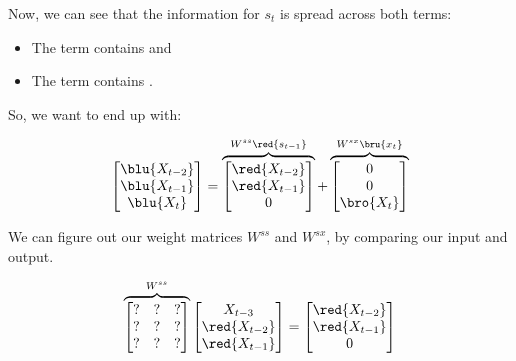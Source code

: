         Now, we can see that the information for $s_t$ is spread across both terms:

        \begin{itemize}
            \item The  term contains  and 
            \item The  term contains . 
        \end{itemize}

        So, we want to end up with:

        \begin{equation}
            \begin{bmatrix}
                \blu{X_{t-2}} \\ \blu{X_{t-1}} \\ \blu{X_{t}}
            \end{bmatrix} 
            =
            \overbrace{
                \begin{bmatrix}
                    \red{X_{t-2}} \\ \red{X_{t-1}} \\ 0
                \end{bmatrix}
            }^{W^{ss}\red{s_{t-1}} }
            +
            \overbrace{
                \begin{bmatrix}
                    0 \\ 0 \\ \bro{X_t}
                \end{bmatrix}
            }^{W^{sx}\bru{x_t}}
        \end{equation}

    \subsecdiv

        We can figure out our weight matrices $W^{ss}$ and $W^{sx}$, by comparing our input and output.


        \begin{equation}
            \overbrace{
                \begin{bmatrix}
                    ? & ? & ? \\
                    ? & ? & ? \\
                    ? & ? & ?
                \end{bmatrix}
            }^{W^{ss}}
            \begin{bmatrix}
                X_{t-3} \\ \red{X_{t-2}} \\ \red{X_{t-1}}
            \end{bmatrix} 
            = 
            \begin{bmatrix}
                \red{X_{t-2}} \\ \red{X_{t-1}} \\ 0
            \end{bmatrix}
        \end{equation}

